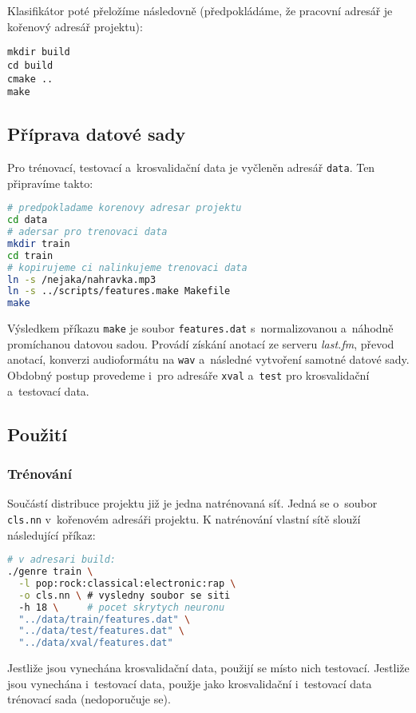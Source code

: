 \documentclass[10pt,a4paper,twocolumn]{article}
\begin{document}
Klasifikátor poté přeložíme následovně (předpokládáme, že pracovní adresář je kořenový adresář projektu):

\begin{lstlisting}
mkdir build
cd build
cmake ..
make
\end{lstlisting}

\subsection{Příprava datové sady}

Pro trénovací, testovací a~krosvalidační data je vyčleněn adresář \verb|data|.
Ten připravíme takto:

\begin{lstlisting}[language=sh]
# predpokladame korenovy adresar projektu
cd data
# adersar pro trenovaci data
mkdir train
cd train
# kopirujeme ci nalinkujeme trenovaci data
ln -s /nejaka/nahravka.mp3
ln -s ../scripts/features.make Makefile
make
\end{lstlisting}

Výsledkem příkazu \verb|make| je soubor \verb|features.dat|
s~normalizovanou a~náhodně promíchanou datovou sadou.
Provádí získání anotací ze serveru \emph{last.fm},
převod anotací, konverzi audioformátu na \verb|wav|
a~následné vytvoření samotné datové sady.
Obdobný postup provedeme i~pro adresáře \verb|xval| a~\verb|test|
pro krosvalidační a~testovací data.

\newpage
\subsection{Použití}

\subsubsection{Trénování}

Součástí distribuce projektu již je jedna natrénovaná síť.
Jedná se o~soubor \verb|cls.nn| v~kořenovém adresáři projektu.
K natrénování vlastní sítě slouží následující příkaz:

\begin{lstlisting}[language=sh]
# v adresari build:
./genre train \
  -l pop:rock:classical:electronic:rap \
  -o cls.nn \ # vysledny soubor se siti
  -h 18 \     # pocet skrytych neuronu
  "../data/train/features.dat" \
  "../data/test/features.dat" \
  "../data/xval/features.dat"
\end{lstlisting}

Jestliže jsou vynechána krosvalidační data, použijí se místo nich testovací.
Jestliže jsou vynechána i~testovací data, použje jako krosvalidační i~testovací data
trénovací sada (nedoporučuje se).
\end{document}
